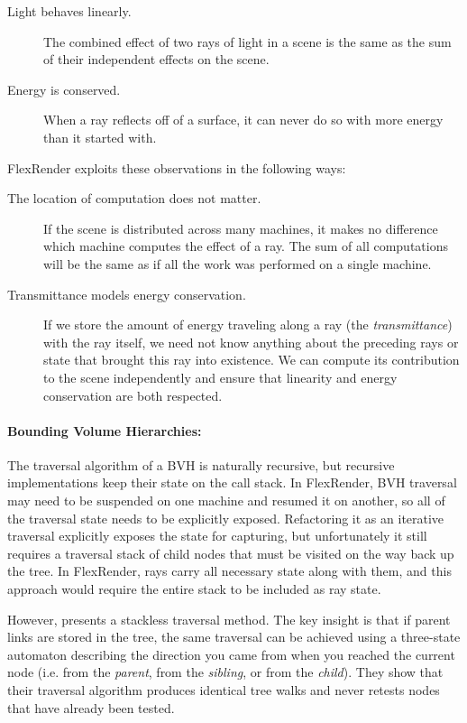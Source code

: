 \documentclass[a4paper,twoside]{article}
\begin{document}
\begin{description}
    \item[Light behaves linearly.] The combined effect of two rays of light
        in a scene is the same as the sum of their independent effects on the
        scene.
    \item[Energy is conserved.] When a ray reflects off of a surface, it can
        never do so with more energy than it started with.
\end{description}

\noindent FlexRender exploits these observations in the following ways:

\begin{description}
    \item[The location of computation does not matter.] If the scene is
        distributed across many machines, it makes no difference which machine
        computes the effect of a ray. The sum of all computations will be the
        same as if all the work was performed on a single machine.
    \item[Transmittance models energy conservation.] If we store the amount of
        energy traveling along a ray (the \emph{transmittance}) with the ray
        itself, we need not know anything about the preceding rays or state
        that brought this ray into existence. We can compute its contribution
        to the scene independently and ensure that linearity and energy
        conservation are both respected.
\end{description}

\paragraph{Bounding Volume Hierarchies:}
The traversal algorithm of a BVH is naturally recursive, but recursive
implementations keep their state on the call stack. In FlexRender, BVH traversal may need
to be suspended on one machine and resumed it on another, so
all of the traversal state needs to be explicitly exposed. Refactoring it as an iterative
traversal explicitly exposes the state for capturing, but unfortunately it still
requires a traversal stack of child nodes that must be visited on the way back
up the tree. In FlexRender, rays carry all necessary state along with them,
and this approach would require the entire stack to be included as ray state.

However, \cite{hapala:2011} presents a stackless traversal method. The key
insight is that if parent links are stored in the tree, the same traversal can
be achieved using a three-state automaton describing the direction you came
from when you reached the current node (i.e. from the \emph{parent}, from the
\emph{sibling}, or from the \emph{child}). They show that their traversal
algorithm produces identical tree walks and never retests nodes that have
already been tested.
\end{document}
